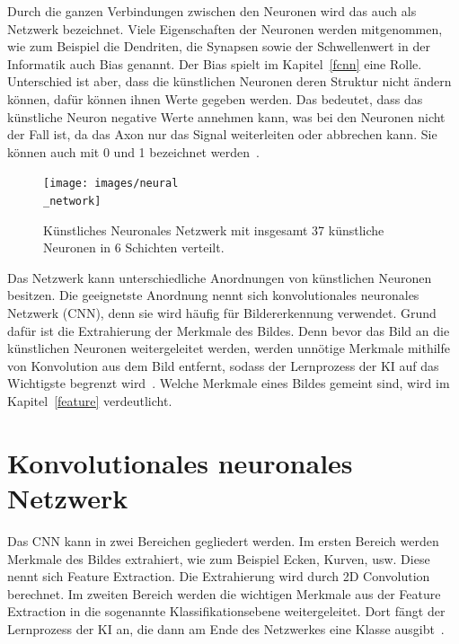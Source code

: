 \documentclass[11pt]{article}
\begin{document}
Durch die ganzen Verbindungen zwischen den Neuronen wird das auch als Netzwerk bezeichnet. Viele Eigenschaften der Neuronen werden mitgenommen, wie zum Beispiel die Dendriten, die Synapsen sowie
der Schwellenwert in der Informatik auch Bias genannt. Der Bias spielt im Kapitel~\ref{fcnn} eine Rolle. Unterschied ist aber,
dass die künstlichen Neuronen deren Struktur nicht ändern können, dafür können ihnen Werte gegeben werden. Das bedeutet, dass das künstliche Neuron
negative Werte annehmen kann, was bei den Neuronen nicht der Fall ist, da das Axon nur das Signal weiterleiten oder abbrechen kann. Sie können auch mit 0 und 1 bezeichnet werden~\cite{5}.
\begin{figure}[h]
    \centering
    \texttt{[image: images/neural\\\_network]}
    \caption[Künstliches Neuronales Netzwerk]{Künstliches Neuronales Netzwerk mit insgesamt 37 künstliche Neuronen in 6 Schichten verteilt.}\label{fnnpic}
\end{figure}
Das Netzwerk kann unterschiedliche Anordnungen von künstlichen Neuronen besitzen. Die geeignetste Anordnung nennt sich
konvolutionales neuronales Netzwerk (CNN), denn sie wird häufig für Bildererkennung verwendet. Grund dafür ist die Extrahierung der Merkmale
des Bildes. Denn bevor das Bild an die künstlichen Neuronen weitergeleitet werden, werden unnötige Merkmale mithilfe von Konvolution aus dem Bild entfernt, sodass der
Lernprozess der KI auf das Wichtigste begrenzt wird~\cite{12}. Welche Merkmale eines Bildes gemeint sind, wird im Kapitel~\ref{feature} verdeutlicht.

\section{Konvolutionales neuronales Netzwerk}

Das CNN kann in zwei Bereichen gegliedert werden. Im ersten Bereich werden Merkmale des Bildes extrahiert, wie zum Beispiel Ecken, Kurven, usw. Diese nennt sich Feature Extraction.
Die Extrahierung wird durch 2D Convolution berechnet. Im zweiten Bereich werden die
wichtigen Merkmale aus der Feature Extraction in die sogenannte Klassifikationsebene weitergeleitet. Dort fängt der Lernprozess
der KI an, die dann am Ende des Netzwerkes eine Klasse ausgibt~\cite{12}.
\end{document}
